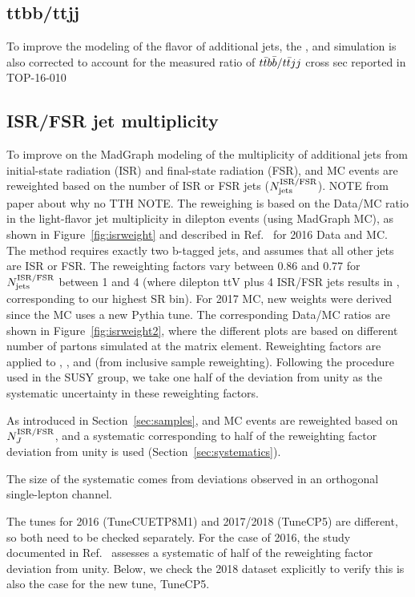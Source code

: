 \subsection{ttbb/ttjj}

  To improve the modeling of the flavor of additional jets, the \ttW, \ttZ
  and \ttH simulation is also corrected to account for the measured ratio of
  $t\bar{t} b\bar{b} / t\bar{t} jj$ cross sec reported in TOP-16-010

\subsection{ISR/FSR jet multiplicity}

To improve on the MadGraph modeling of the
multiplicity of additional jets from initial-state radiation (ISR) and
final-state radiation (FSR),
 \ttW and \ttZ MC events are reweighted based on the
number of ISR or FSR jets ($N_\text{jets}^{\rm ISR/FSR}$).
NOTE from paper about why no TTH NOTE.
The reweighing is based on the Data/MC ratio in the light-flavor jet
multiplicity in dilepton \ttbar events (using MadGraph MC), as shown in Figure~\ref{fig:isrweight}
and described in Ref.~\cite{CMS:isrweight} for 2016 Data and MC.
The method requires exactly two b-tagged jets, and assumes that all other jets are ISR or FSR.
The reweighting factors vary between 0.86 and 0.77 for
$N_\text{jets}^{\rm ISR/FSR}$ between 1 and 4 (where dilepton ttV plus 4 ISR/FSR jets results in , corresponding to our highest SR bin).
For 2017 MC, new weights were derived since the MC uses a new Pythia tune.
The corresponding Data/MC ratios are shown in Figure~\ref{fig:isrweight2}, where the different plots
are based on different number of partons simulated at the matrix element.
Reweighting factors are applied to \ttW, \ttZ, and \ttbar (from inclusive sample reweighting).
Following the procedure used in the SUSY group,
we take one half of the deviation
from unity as the systematic uncertainty in these reweighting factors.

As introduced in Section~\ref{sec:samples}, \ttW and \ttZ MC events are reweighted based on $N_J^{\rm ISR/FSR}$, and a
systematic corresponding to half of the reweighting factor deviation from unity is used (Section~\ref{sec:systematics}).

The size of the systematic comes from deviations observed in an orthogonal single-lepton channel.

The tunes for 2016 (TuneCUETP8M1) and 2017/2018 (TuneCP5) are different, so both need to be checked separately. For the case of 2016,
the study documented in Ref.~\cite{CMS:isrweight} 
assesses a systematic of half of the reweighting factor deviation from unity.
Below, we check the 2018 dataset explicitly to verify this is also the case for the new tune, TuneCP5.

